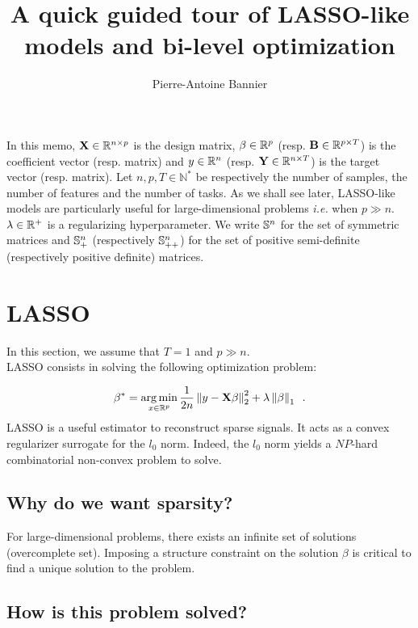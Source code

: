 \documentclass[a4paper,10pt]{article}
\author{Pierre-Antoine Bannier}
\title{A quick guided tour of LASSO-like models and bi-level optimization}
\theoremstyle{definition}
\begin{document}
\maketitle

\vskip 0.3in

In this memo, $\mathbf{X} \in \mathbb{R}^{n \times p}$ is the design matrix, $\beta \in \mathbb{R}^{p}$ (resp. $\mathbf{B} \in \mathbb{R}^{p \times T}$) is the coefficient vector (resp. matrix) and $y \in \mathbb{R}^n$
(resp. $\mathbf{Y} \in \mathbb{R}^{n \times T}$) is the target vector (resp. matrix). Let $n, p, T \in \mathbb{N}^*$ be respectively the number of samples, the number of features and the number of tasks. As we shall see later, LASSO-like models
are particularly useful for large-dimensional problems \textit{i.e.} when $p \gg n$. $\lambda \in \mathbb{R}^+$ is a regularizing hyperparameter. We write $\mathbb{S}^n$ for the set of symmetric matrices and $\mathbb{S}^n_+$ (respectively $\mathbb{S}^n_{++}$) for
the set of positive semi-definite (respectively positive definite) matrices.


\section{LASSO}
\label{section_1}

In this section, we assume that $T = 1$ and $p \gg n$.
\\
LASSO consists in solving the following optimization problem:

\begin{equation*}
    \beta^* = \operatorname*{arg\,min}_{x \in \mathbb{R}^{p}} \frac{1}{2n}\left \lVert  y - \mathbf{X} \beta \right \rVert_2^2
    + \lambda \left \lVert  \beta  \right \rVert_{1}
    \enspace .
\end{equation*}
%
LASSO is a useful estimator to reconstruct sparse signals. It acts as a convex regularizer surrogate for the $l_0$ norm. Indeed, the
$l_0$ norm yields a $NP$-hard combinatorial non-convex problem to solve. \\

\subsection*{Why do we want sparsity?}

For large-dimensional problems, there exists an infinite set of solutions (overcomplete set).
Imposing a structure constraint on the solution $\beta$ is critical to find a unique solution to the problem.

\subsection*{How is this problem solved?}
\end{document}
